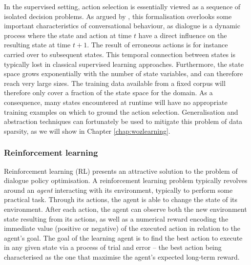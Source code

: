 In the supervised setting, action selection is essentially viewed as a sequence of isolated decision problems.  As argued by \cite{817450}, this formalisation overlooks some important characteristics of conversational behaviour, as dialogue is a dynamic process where the state and action at time $t$ have a direct influence on the resulting state at time $t+1$.  The result of erroneous actions is for instance carried over to subsequent states. This temporal connection between states is typically lost in classical supervised learning approaches. Furthermore, the state space grows exponentially with the number of state variables, and can therefore reach very large sizes.  The training data available from a fixed corpus will therefore only cover a fraction of the state space for the domain.  As a consequence, many states encountered at runtime will have no appropriate training examples on which to ground the action selection.  Generalisation and abstraction techniques can fortunately be used to mitigate this problem of data sparsity, as we will show in Chapter \ref{chap:wozlearning}.

\subsubsection*{Reinforcement learning}

Reinforcement learning (RL) presents an attractive solution to the problem of dialogue policy optimisation.  A reinforcement learning problem typically revolves around an \textit{agent} interacting with its environment, typically to perform some practical task.  Through its actions, the agent is able to change the state of its environment.  After each action, the agent can observe both the new environment state resulting from its actions, as well as a numerical reward encoding the immediate value (positive or negative) of the executed action in relation to the agent's goal. The goal of the learning agent is to find the best action to execute in any given state via a process of trial and error  -- the best action being characterised as the one that maximise the agent's expected long-term reward.  

